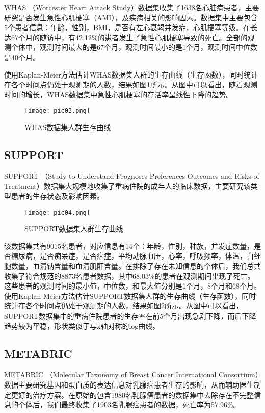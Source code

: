 WHAS （Worcester Heart Attack Study）数据集收集了1638名心脏病患者，主要研究是否发生急性心肌梗塞（AMI），及疾病相关的影响因素。数据集中主要包含5个患者信息：年龄，性别，BMI，是否有左心衰竭并发症，心肌梗塞等级。在长达67个月的随访中，有42.12\%的患者发生了急性心肌梗塞导致的死亡。全部的观测个体中，观测时间最大的是67个月，观测时间最小的是1个月，观测时间中位数是40个月。

使用Kaplan-Meier方法估计WHAS数据集人群的生存曲线（生存函数），同时统计在各个时间点仍处于观测期的人数，结果如图\ref{pic03}所示。从图中可以看出，随着观测时间的增长，WHAS数据集中急性心肌梗塞的存活率呈线性下降的趋势。

\begin{figure}[H]
\texttt{[image: pic03.png]}
\caption{WHAS数据集人群生存曲线}
\label{pic03}
\end{figure}

\subsection{SUPPORT}

SUPPORT （Study to Understand Prognoses Preferences Outcomes and Risks of Treatment）数据集大规模地收集了重病住院的成年人的临床数据，主要研究该类型患者的生存状态及影响因素。

\begin{figure}[H]
\texttt{[image: pic04.png]}
\caption{SUPPORT数据集人群生存曲线}
\label{pic04}
\end{figure}

该数据集共有9015名患者，对应信息有14个：年龄，性别，种族，并发症数量，是否糖尿病，是否痴呆症，是否癌症，平均动脉血压，心率，呼吸频率，体温，白细胞数量，血清钠含量和血清肌酐含量。在排除了存在未知信息的个体后，我们总共收集了符合规范的8873名患者数据，其中68.03\%的患者在观测期间出现了死亡。这些患者的观测时间的最小值，中位数，和最大值分别是1个月，8个月和68个月。使用Kaplan-Meier方法估计SUPPORT数据集人群的生存曲线（生存函数），同时统计在各个时间点仍处于观测期的人数，结果如图\ref{pic04}所示。从图中可以看出，SUPPORT数据集中的重病住院患者的生存率在前5个月出现急剧下降，而后下降趋势较为平稳，形状类似于与x轴对称的log曲线。

\subsection{METABRIC}

METABRIC （Molecular Taxonomy of Breast Cancer International Consortium）数据主要研究基因和蛋白质的表达信息对乳腺癌患者生存的影响，从而辅助医生制定更好的治疗方案。在原始的包含1980名乳腺癌患者的数据集中去除存在不完整信息的个体后，我们最终收集了1903名乳腺癌患者的数据，死亡率为57.96\%。


